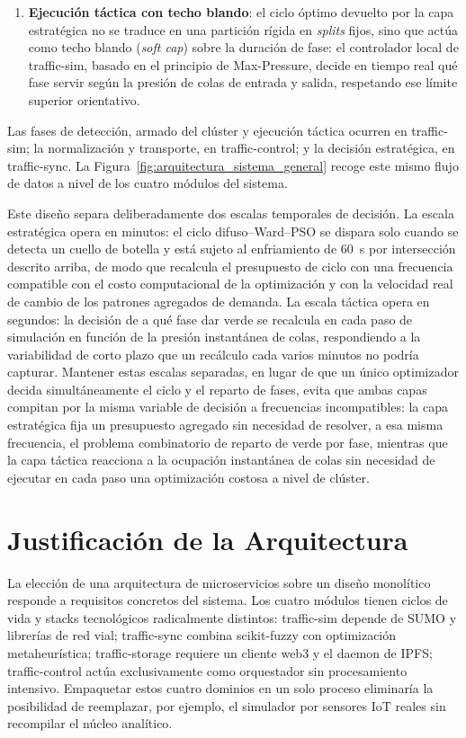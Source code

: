 \begin{enumerate}
    \item \textbf{Ejecución táctica con techo blando}: el ciclo óptimo devuelto por la capa estratégica no se traduce en una partición rígida en \emph{splits} fijos, sino que actúa como techo blando (\emph{soft cap}) sobre la duración de fase: el controlador local de traffic-sim, basado en el principio de Max-Pressure, decide en tiempo real qué fase servir según la presión de colas de entrada y salida, respetando ese límite superior orientativo.
\end{enumerate}

Las fases de detección, armado del clúster y ejecución táctica ocurren en traffic-sim; la normalización y transporte, en traffic-control; y la decisión estratégica, en traffic-sync. La Figura~\ref{fig:arquitectura_sistema_general} recoge este mismo flujo de datos a nivel de los cuatro módulos del sistema.

Este diseño separa deliberadamente dos escalas temporales de decisión. La escala estratégica opera en minutos: el ciclo difuso--Ward--PSO se dispara solo cuando se detecta un cuello de botella y está sujeto al enfriamiento de 60~s por intersección descrito arriba, de modo que recalcula el presupuesto de ciclo con una frecuencia compatible con el costo computacional de la optimización y con la velocidad real de cambio de los patrones agregados de demanda. La escala táctica opera en segundos: la decisión de a qué fase dar verde se recalcula en cada paso de simulación en función de la presión instantánea de colas, respondiendo a la variabilidad de corto plazo que un recálculo cada varios minutos no podría capturar. Mantener estas escalas separadas, en lugar de que un único optimizador decida simultáneamente el ciclo y el reparto de fases, evita que ambas capas compitan por la misma variable de decisión a frecuencias incompatibles: la capa estratégica fija un presupuesto agregado sin necesidad de resolver, a esa misma frecuencia, el problema combinatorio de reparto de verde por fase, mientras que la capa táctica reacciona a la ocupación instantánea de colas sin necesidad de ejecutar en cada paso una optimización costosa a nivel de clúster.

\section{Justificación de la Arquitectura}

La elección de una arquitectura de microservicios sobre un diseño monolítico responde a requisitos concretos del sistema. Los cuatro módulos tienen ciclos de vida y stacks tecnológicos radicalmente distintos: traffic-sim depende de SUMO y librerías de red vial; traffic-sync combina scikit-fuzzy con optimización metaheurística; traffic-storage requiere un cliente web3 y el daemon de IPFS; traffic-control actúa exclusivamente como orquestador sin procesamiento intensivo. Empaquetar estos cuatro dominios en un solo proceso eliminaría la posibilidad de reemplazar, por ejemplo, el simulador por sensores IoT reales sin recompilar el núcleo analítico.

